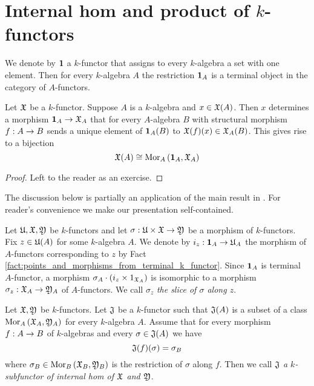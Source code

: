 \section{Internal hom and product of $k$-functors}
\noindent
We denote by $\mathbf{1}$ a $k$-functor that assigns to every $k$-algebra a set with one element. Then for every $k$-algebra $A$ the restriction $\mathbf{1}_A$ is a terminal object in the category of $A$-functors.

\begin{fact}\label{fact:points_and_morphisms_from_terminal_k_functor}
Let ${\mathfrak X}$ be a $k$-functor. Suppose $A$ is a $k$-algebra and $x\in {\mathfrak X}(A)$. Then $x$ determines a morphism $\mathbf{1}_{A}\rightarrow {\mathfrak X}_A$ that for every $A$-algebra $B$ with structural morphism $f:A\rightarrow B$ sends a unique element of $\mathbf{1}_{A}(B)$ to ${\mathfrak X}(f)(x)\in {\mathfrak X}_A(B)$. This gives rise to a bijection
$${\mathfrak X}(A)\cong \mathrm{Mor}_{A}\left(\mathbf{1}_{A},{\mathfrak X}_A\right)$$
\end{fact}
\begin{proof}
Left to the reader as an exercise.
\end{proof}
\noindent
The discussion below is partially an application of the main result in {\cite[section 6]{Presheaves}}. For reader's convenience we make our presentation self-contained.

\begin{definition}
Let ${\mathfrak U},{\mathfrak X},{\mathfrak Y}$ be $k$-functors and let $\sigma:{\mathfrak U}\times {\mathfrak X}\rightarrow {\mathfrak Y}$ be a morphism of $k$-functors. Fix $z\in {\mathfrak U}(A)$ for some $k$-algebra $A$. We denote by $i_z:\mathbf{1}_A\rightarrow {\mathfrak U}_A$ the morphism of $A$-functors corresponding to $z$ by Fact \ref{fact:points_and_morphisms_from_terminal_k_functor}. Since $\mathbf{1}_A$ is terminal $A$-functor, a morphism $\sigma_A\cdot \left(i_z\times 1_{{\mathfrak X}_A}\right)$ is isomorphic to a morphism $\sigma_z:{\mathfrak X}_A\rightarrow {\mathfrak Y}_A$ of $A$-functors. We call $\sigma_z$ \textit{the slice of $\sigma$ along $z$}.
\end{definition}

\begin{definition}
Let ${\mathfrak X}, {\mathfrak Y}$ be $k$-functors. Let ${\mathfrak J}$ be a $k$-functor such that ${\mathfrak J}(A)$ is a subset of a class $\mathrm{Mor}_A\left({\mathfrak X}_A,{\mathfrak Y}_A\right)$ for every $k$-algebra $A$. Assume that for every morphism $f:A\rightarrow B$ of $k$-algebras and every $\sigma\in {\mathfrak J}(A)$ we have
$${\mathfrak J}(f)(\sigma) = \sigma_B$$
where $\sigma_B\in \mathrm{Mor}_B\left({\mathfrak X}_B,{\mathfrak Y}_B\right)$ is the restriction of $\sigma$ along $f$. Then we call ${\mathfrak J}$ \textit{a $k$-subfunctor of internal hom of ${\mathfrak X}$ and ${\mathfrak Y}$}.
\end{definition}

